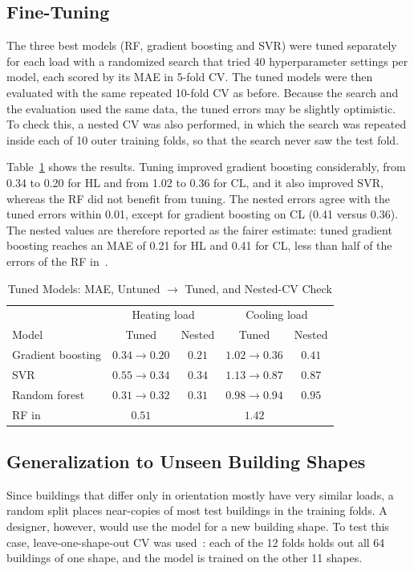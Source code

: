 \documentclass[journal]{IEEEtran}
\begin{document}
\subsection{Fine-Tuning}
The three best models (RF, gradient boosting and SVR) were tuned separately for each load with a
randomized search that tried 40 hyperparameter settings per model, each scored by its MAE in 5-fold CV.
The tuned models were then evaluated with the same repeated 10-fold CV as before. Because the search and
the evaluation used the same data, the tuned errors may be slightly optimistic. To check this, a nested CV
was also performed, in which the search was repeated inside each of 10 outer training folds, so that the
search never saw the test fold.

Table~\ref{tab:tuned} shows the results. Tuning improved gradient boosting considerably, from 0.34 to 0.20
for HL and from 1.02 to 0.36 for CL, and it also improved SVR, whereas the RF did not benefit from tuning.
The nested errors agree with the tuned errors within 0.01, except for gradient boosting on CL (0.41 versus
0.36). The nested values are therefore reported as the fairer estimate: tuned gradient boosting reaches an
MAE of 0.21 for HL and 0.41 for CL, less than half of the errors of the RF in~\cite{tsanas2012}.

\begin{table}[!tb]
\caption{Tuned Models: MAE, Untuned $\rightarrow$ Tuned, and Nested-CV Check}
\label{tab:tuned}
\centering
\begin{tabular}{@{}lcccc@{}}
\toprule
& \multicolumn{2}{c}{Heating load} & \multicolumn{2}{c}{Cooling load} \\
Model & Tuned & Nested & Tuned & Nested \\
\midrule
Gradient boosting  & $0.34 \rightarrow \mathbf{0.20}$ & $\mathbf{0.21}$ & $1.02 \rightarrow \mathbf{0.36}$ & $\mathbf{0.41}$ \\
SVR                & $0.55 \rightarrow 0.34$ & $0.34$ & $1.13 \rightarrow 0.87$ & $0.87$ \\
Random forest      & $0.31 \rightarrow 0.32$ & $0.31$ & $0.98 \rightarrow 0.94$ & $0.95$ \\
\midrule
RF in~\cite{tsanas2012} & $0.51$ & & $1.42$ & \\
\bottomrule
\end{tabular}
\end{table}

\subsection{Generalization to Unseen Building Shapes}
Since buildings that differ only in orientation mostly have very similar loads, a random split places
near-copies of most test buildings in the training folds. A designer, however, would use the model for
a new building shape. To test this case, leave-one-shape-out CV was used~\cite{roberts2017}: each of the
12 folds holds out all 64 buildings of one shape, and the model is trained on the other 11 shapes.
\end{document}
